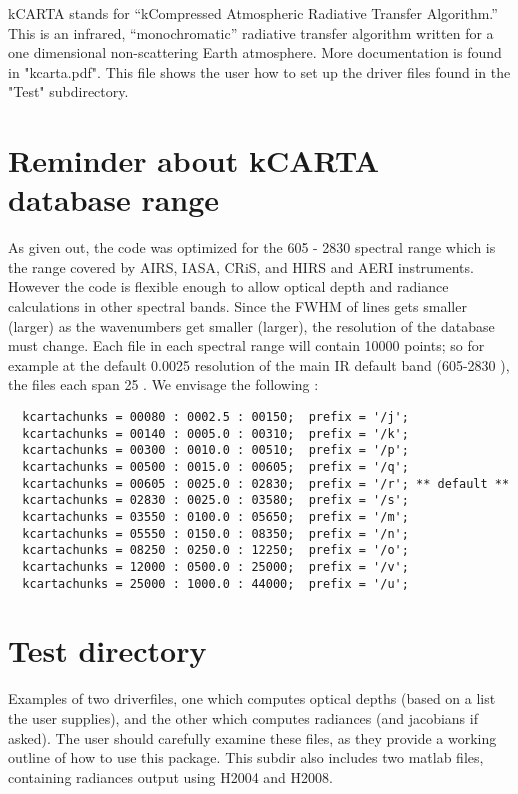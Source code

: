 \documentclass[12pt]{article}
\newcommand{\kc}{\textsf{kCARTA}\xspace}
\begin{document}
\kc stands for ``kCompressed Atmospheric Radiative Transfer
Algorithm.''  This is an infrared, ``monochromatic'' radiative
transfer algorithm written for a one dimensional non-scattering Earth
atmosphere. More documentation is found in "kcarta.pdf". This file 
shows the user how to set up the driver files found in the "Test" subdirectory.

\section{Reminder about kCARTA database range}
As given out, the code was optimized for the 605 - 2830 \wn spectral range 
which is the range covered by AIRS, IASA, CRiS, and HIRS and AERI instruments.
However the code is flexible enough to allow optical depth and radiance 
calculations in other spectral bands. Since the FWHM of lines gets smaller 
(larger) as the wavenumbers get smaller (larger), the resolution of the 
database must change. Each file in each spectral range will contain 10000 
points; so for example at the default 0.0025 \wn resolution of the main IR 
default band (605-2830 \wn), the files each span 25 \wn. We envisage the 
following :

\begin{verbatim}
  kcartachunks = 00080 : 0002.5 : 00150;  prefix = '/j';
  kcartachunks = 00140 : 0005.0 : 00310;  prefix = '/k';
  kcartachunks = 00300 : 0010.0 : 00510;  prefix = '/p';
  kcartachunks = 00500 : 0015.0 : 00605;  prefix = '/q';
  kcartachunks = 00605 : 0025.0 : 02830;  prefix = '/r'; ** default **
  kcartachunks = 02830 : 0025.0 : 03580;  prefix = '/s';
  kcartachunks = 03550 : 0100.0 : 05650;  prefix = '/m';
  kcartachunks = 05550 : 0150.0 : 08350;  prefix = '/n';
  kcartachunks = 08250 : 0250.0 : 12250;  prefix = '/o';
  kcartachunks = 12000 : 0500.0 : 25000;  prefix = '/v';
  kcartachunks = 25000 : 1000.0 : 44000;  prefix = '/u';
\end{verbatim}

\section{Test directory}
Examples of two driverfiles, one which computes optical depths (based on a 
list the user supplies), and the other which computes radiances (and 
jacobians if asked). The user should carefully examine these files, as they
provide a working outline of how to use this package.
This subdir also includes two matlab files, containing radiances output
using H2004 and H2008.
\end{document}
